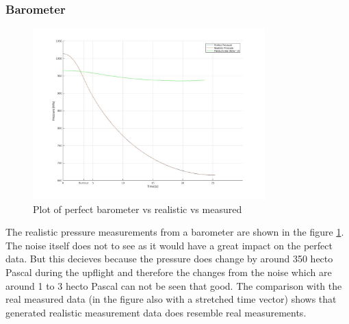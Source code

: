 \subsubsection{Barometer}
\begin{figure}[h!]
 \centering
 \includegraphics[width=0.8\textwidth]{./Pictures/PressurePerfVSReal.jpg}
 \caption{Plot of perfect barometer vs realistic vs measured}
 \label{fig:PressurePerfVSReal}
\end{figure}
The realistic pressure measurements from a barometer are shown in the figure \ref{fig:PressurePerfVSReal}.
The noise itself does not to see as it would have a great impact on the perfect data.
But this decieves because the pressure does change by around 350 hecto Pascal during the upflight
and therefore the changes from the noise which are around 1 to 3 hecto Pascal can not be seen that good.
The comparison with the real measured data (in the figure also with a stretched time vector) shows that generated realistic measurement data does resemble real measurements.

\newpage
